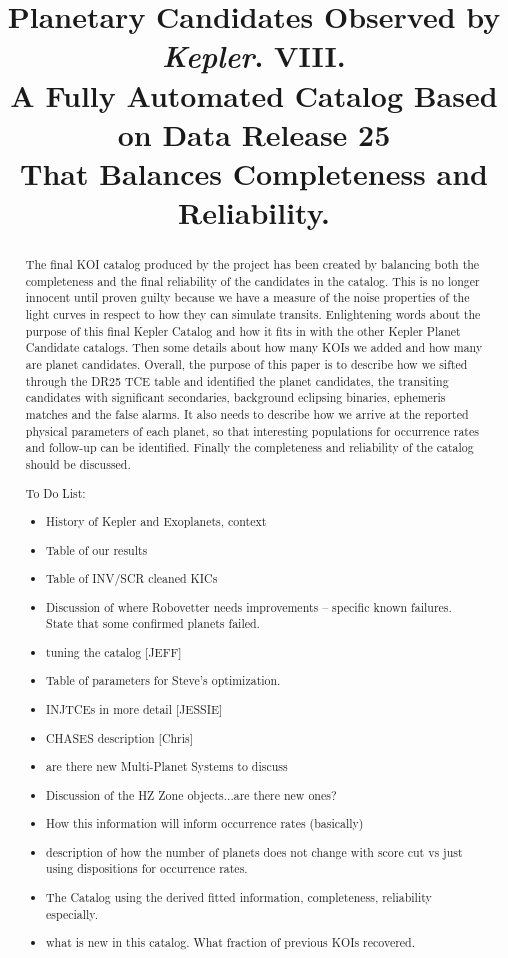 \documentclass[apj,twocolappendix,numberedappendix]{emulateapj}
\renewcommand{\_}{\discretionary{\underscore}{}{\underscore}}  %
\newcommand\Kepler{\textit{Kepler}}
\begin{document}

\title{Planetary Candidates Observed by \Kepler. VIII.\\
A Fully Automated Catalog Based on Data Release 25\\That Balances Completeness and Reliability. }



\begin{abstract}
The final KOI catalog produced by the project has been created by balancing both the completeness and the final reliability of the candidates in the catalog. This is no longer innocent until proven guilty because we have a measure of the noise properties of the light curves in respect to how they can simulate transits.
Enlightening words about the purpose of this final Kepler Catalog and how it fits in with the other Kepler Planet Candidate catalogs. Then some details about how many KOIs we added and how many are planet candidates. 
Overall, the purpose of this paper is to describe how we sifted through the DR25 TCE table and identified the planet candidates, the transiting candidates with significant secondaries, background eclipsing binaries, ephemeris matches and the false alarms. It also needs to describe how we arrive at the reported physical parameters of each planet, so that interesting populations for occurrence rates and follow-up can be identified.  Finally the completeness and reliability of the catalog should be discussed.

To Do List:
\begin{itemize}
\item History of Kepler and Exoplanets, context
\item Table of our results
\item Table of INV/SCR cleaned KICs
\item Discussion of where Robovetter needs improvements -- specific known failures. State that some confirmed planets failed.
\item tuning the catalog [JEFF]
\item Table of parameters for Steve's optimization.
\item INJTCEs in more detail [JESSIE]
\item CHASES description [Chris]
\item are there new Multi-Planet Systems to discuss
\item Discussion of the HZ Zone objects...are there new ones?
\item How this information will inform occurrence rates (basically)
\item description of how the number of planets does not change with score cut vs just using dispositions for occurrence rates.
\item The Catalog using the derived fitted information, completeness, reliability especially.
\item what is new in this catalog. What fraction of previous KOIs recovered.


\end{itemize}
\end{abstract}
\end{document}
